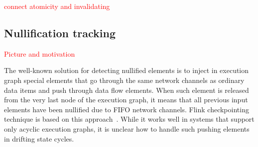 \textcolor{red}{connect atomicity and invalidating}


\subsection{Nullification tracking}

\textcolor{red}{Picture and motivation}


The well-known solution for detecting nullified elements is to inject in execution graph special elements that go through the same network channels as ordinary data items and push through data flow elements. When such element is released from the very last node of the execution graph, it means that all previous input elements have been nullified due to FIFO network channels. Flink checkpointing technique is based on this approach~\cite{Carbone:2017:SMA:3137765.3137777}. While it works well in systems that support only acyclic execution graphs, it is unclear how to handle such pushing elements in drifting state cycles. 

